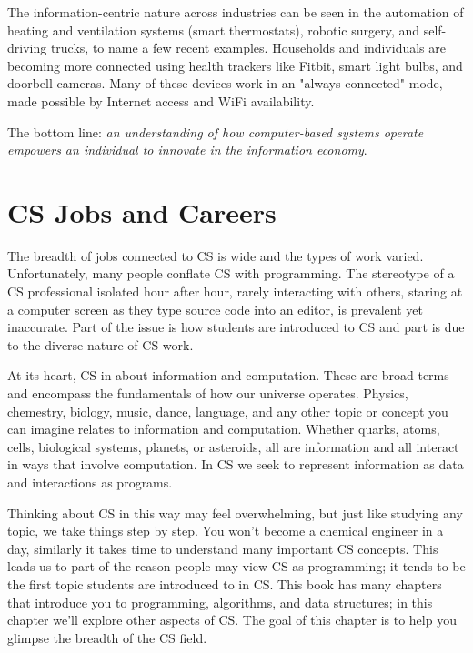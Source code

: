 The information-centric nature across industries can be seen in the automation of heating and ventilation systems (smart thermostats), robotic surgery, and self-driving trucks, to name a few recent examples. Households and individuals are becoming more connected using health trackers like Fitbit, smart light bulbs, and doorbell cameras. Many of these devices work in an "always connected" mode, made possible by Internet access and WiFi availability.

The bottom line: \emph{an understanding of how computer-based systems operate empowers an individual to innovate in the information economy}.  


\section{CS Jobs and Careers}

The breadth of jobs connected to CS is wide and the types of work varied. Unfortunately, many people conflate CS with programming. The stereotype of a CS professional isolated hour after hour, rarely interacting with others, staring at a computer screen as they type source code into an editor, is prevalent yet inaccurate. Part of the issue is how students are introduced to CS and part is due to the diverse nature of CS work.

At its heart, CS in about information and computation. These are broad terms and encompass the fundamentals of how our universe operates. Physics, chemestry, biology, music, dance, language, and any other topic or concept you can imagine relates to information and computation. Whether quarks, atoms, cells, biological systems, planets, or asteroids, all are information and all interact in ways that involve computation. In CS we seek to represent information as data and interactions as programs.

Thinking about CS in this way may feel overwhelming, but just like studying any topic, we take things step by step. You won't become a chemical engineer in a day, similarly it takes time to understand many important CS concepts. This leads us to part of the reason people may view CS as programming; it tends to be the first topic students are introduced to in CS. This book has many chapters that introduce you to programming, algorithms, and data structures; in this chapter we'll explore other aspects of CS. The goal of this chapter is to help you glimpse the breadth of the CS field.

